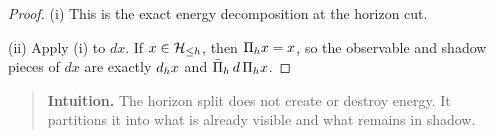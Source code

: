 \begin{proof}
(i) This is the exact energy decomposition at the horizon cut.

(ii) Apply (i) to $dx$.
If $x \in \mathcal{H}_{\le h}$, then $\Pi_{h}x = x$, so the observable and shadow pieces of $dx$ are exactly $d_{h}x$ and $\bar{\Pi}_{h}\, d \,\Pi_{h}x$.
\end{proof}

\begin{quote}\small
\textbf{Intuition.}
The horizon split does not create or destroy energy.
It partitions it into what is already visible and what remains in shadow.
\end{quote}
